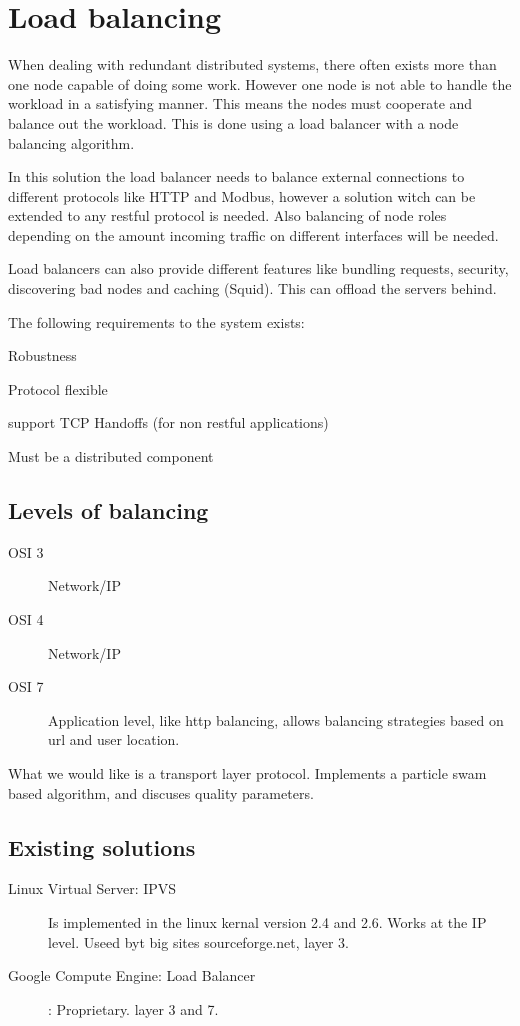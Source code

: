 \chapter{Load balancing}

When dealing with redundant distributed systems, there often exists more than one node capable of doing some work.
However one node is not able to handle the workload in a satisfying manner.
This means the nodes must cooperate and balance out the workload.
This is done using a load balancer with a node balancing algorithm.

In this solution the load balancer needs to balance external connections to different protocols like HTTP and Modbus, however a solution witch can be extended to any restful protocol is needed. Also balancing of node roles depending on the amount incoming traffic on different interfaces will be needed.

Load balancers can also provide different features like bundling requests, security, discovering bad nodes and caching (Squid). This can offload the servers behind.

The following requirements to the system exists:
\begin{description}
	\item Robustness
	\item Protocol flexible
	\item support TCP Handoffs (for non restful applications)
	\item Must be a distributed component
\end{description}

\section{Levels of balancing}
\begin{description}
	\item[OSI 3] Network/IP
	\item[OSI 4] Network/IP
	\item[OSI 7] {Application level, like http balancing, allows balancing strategies based on url and user location.}
\end{description}

What we would like is a transport layer protocol.
\cite{Ludwig:SwarmIntelligenceGridLoadBalancing} Implements a particle swam based algorithm, and discuses quality parameters.

\section{Existing solutions}
\begin{description}
	\item[Linux Virtual Server: IPVS] Is implemented in the linux kernal version 2.4 and 2.6. Works at the IP level. Useed byt big sites sourceforge.net, layer 3.
	\item[Google Compute Engine: Load Balancer]: Proprietary. layer 3 and 7.
\end{description}